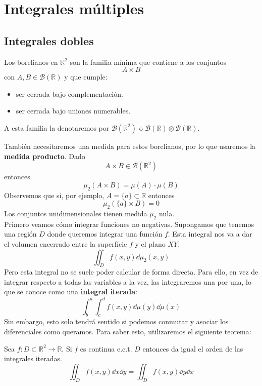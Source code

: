 \documentclass{./Calculo.tex}
\begin{document}
\chapter{Integrales múltiples}
\section{Integrales dobles}
\begin{defin}
    Los borelianos en \(\mathbb{R}^{2}\) son la familia mínima que contiene
    a los conjuntos
    \[
        A \times B
    \]
    con \(A,B \in \mathcal{B}(\mathbb{R})\) y que cumple:
    \begin{itemize}
        \item ser cerrada bajo complementación.
        \item ser cerrada bajo uniones numerables.
    \end{itemize}
    A esta familia la denotaremos por \(\mathcal{B}(\mathbb{R}^{2})\) o
    \(\mathcal{B}(\mathbb{R}) \otimes \mathcal{B}(\mathbb{R})\).
\end{defin}
También necesitaremos una medida para estos borelianos, por lo que usaremos la
\textbf{medida producto}. Dado
\[
    A \times B \in  \mathcal{B}(\mathbb{R}^{2})
\]
entonces
\[
    \mu_{2}(A \times B) = \mu(A)\cdot \mu(B)
\]
Observemos que si, por ejemplo, \(A =\{ a \} \subset \mathbb{R}\) entonces
\[
    \mu_{2}(\{ a \} \times B) = 0
\]
Los conjuntos unidimensionales tienen medida \(\mu_{2}\) nula.\\
Primero veamos cómo integrar funciones no negativas. Supongamos que tenemos
una región \(D\) donde queremos integrar una función \(f\). Esta integral nos va
a dar el volumen encerrado entre la superfície \(f\) y el plano \(XY\).
\[
    \iint_{D} f(x,y) \dd{\mu_{2}(x,y)}
\]
Pero esta integral no se suele poder calcular de forma directa. Para ello,
en vez de integrar respecto a todas las variables a la vez, las integraremos una
por una, lo que se conoce como una \textbf{integral iterada}:
\[
    \int_{b}^a \int_{c}^d f(x,y) \dd{\mu(y)} \dd{\mu(x)}
\]
Sin embargo, esto solo tendrá sentido si podemos conmutar y asociar los
diferenciales como queramos. Para saber esto, utilizaremos el siguiente teorema:
\begin{teorema}
    Sea \(f: D \subset \mathbb{R}^{2} \to \mathbb{R}\). Si \(f\) es continua e.c.t.
    \(D\) entonces da igual el orden de las integrales iteradas.
    \[
        \iint_{D} f(x,y) \dd{x} \dd{y} = \iint_{D} f(x,y) \dd{y} \dd{x}
    \]
\end{teorema}
\end{document}
